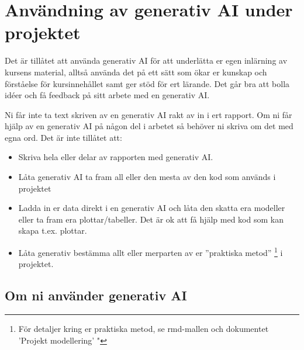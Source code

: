 \documentclass[a4paper]{article}
\begin{document}
\section{Användning av generativ AI under projektet} \label{sec:genAI}

Det är tillåtet att använda  generativ AI för att underlätta er egen inlärning av 
kursens material, alltså använda det på ett sätt som ökar er kunskap och förståelse
för kursinnehållet samt ger stöd för ert lärande. Det går bra att bolla idéer och 
få feedback på sitt arbete med en generativ AI. 

Ni får inte ta text skriven av en generativ AI rakt av in i ert rapport. Om ni får
hjälp av en generativ AI på någon del i arbetet så behöver ni skriva om det med egna ord.
\newline
\newline
Det är inte tillåtet att:
\begin{itemize}
  \item Skriva hela eller delar av rapporten med generativ AI.
  \item Låta generativ AI ta fram all eller den mesta av den kod som används i projektet
  \item Ladda in er data direkt i en generativ AI och låta den skatta era modeller eller 
  ta fram era plottar/tabeller. Det är ok att få hjälp med kod som kan skapa t.ex. plottar.
  \item Låta generativ bestämma allt eller merparten av er ”praktiska metod”
  \footnote{För detaljer kring er praktiska metod, se rmd-mallen och dokumentet 'Projekt modellering' "} i projektet.
\end{itemize}


\subsection*{Om ni använder generativ AI}
\end{document}
